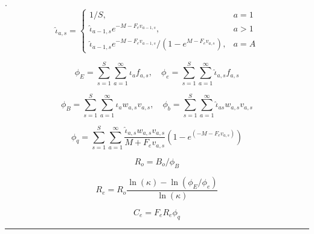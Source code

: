 \documentclass[11pt]{article}   %
\def\beq{\vspace{-5ex} \begin{fleqn} \begin{equation}}   %
\def\eeq{\end{equation} \end{fleqn} \vspace{-5ex}}     %
\def\tabline{\vspace{2ex} \hrule \vspace{2ex}}
\def\vsd{\vspace*{1ex}}     %
\def\newp{\vfill \break}
\begin{document}
\begin{fleqn}    .
\begin{equation}
\hat{\iota}_{a,s} = \left\{
\begin{array}{lll}
1 / S, & a=1\\
\hat{\iota}_{a-1,s}e^{-M -F_e v_{a-1,s}}, & a > 1 \\
\hat{\iota}_{a-1,s}e^{-M -F_e v_{a-1,s}} / (1-e^{M-F_e v_{a,s}}), & a = A
\label{df8}
\end{array}
\right.
\end{equation}
\end{fleqn}
\vspace{2ex}

 \eec

\vspace{2ex}

\beq \phi_E=\sum_{s=1}^S\sum_{a=1}^\infty \iota_a f_{a,s}, \quad
\phi_e=\sum_{s=1}^S\sum_{a=1}^\infty \hat{\iota}_{a,s} f_{a,s}          \label{df9} \eeq \vsd \vsd \vsd

\vspace{2ex}

\beq \phi_B=\sum_{s=1}^S\sum_{a=1}^\infty \iota_a w_{a,s} v_{a,s}, \quad
\phi_b=\sum_{s=1}^S\sum_{a=1}^\infty \hat{\iota}_{as} w_{a,s} v_{a,s}       \label{df10} \eeq \vsd \vsd \vsd

\vspace{2ex}

\beq\phi_q=\sum_{s=1}^S\sum_{a=1}^\infty
                \frac{ \hat{\iota}_{a,s} w_{a,s} v_{a,s}}{M+F_ev_{a,s}}
                \left(1-e^{(-M-F_ev_{a,s})}\right)               \label{df11} \eeq \vsd \vsd \vsd

 \eec

\beq R_o=B_o/ \phi_B   \label{df12} \eeq \vsd \vsd \vsd

\vsd
\beq R_e=R_o \dfrac{\ln(\kappa)-\ln(\phi_E/\phi_e)}{\ln(\kappa)}  \label{df13} \eeq \vsd \vsd \vsd

 
\vsd
\beq C_e=F_e R_e \phi_q   \label{df14} \eeq \vsd \vsd \vsd


\noindent \hrule %
\newp
\end{document}
